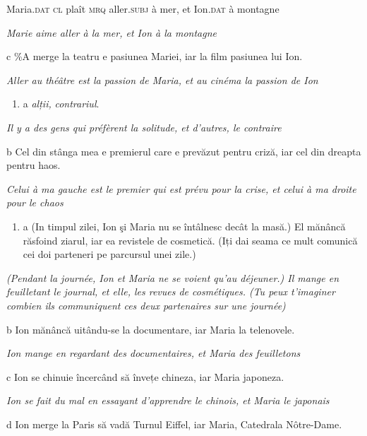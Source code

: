     Maria.\textsc{dat cl} plaît \textsc{mrq} aller.\textsc{subj} à mer, et Ion\textsc{.dat} à montagne

{\itshape
Marie aime aller à la mer, et Ion à la montagne}

  c  \%A merge la teatru e pasiunea Mariei, iar la film pasiunea lui Ion.

{\itshape
Aller au théâtre est la passion de Maria, et au cinéma la passion de Ion}


\begin{enumerate}
\item \label{bkm:Ref289719799}a   \emph{\textup{alții,}}\emph{\textbf{\textup{} }}\emph{\textup{contrariul}}.


\end{enumerate}
{\itshape
Il y a des gens qui préfèrent la solitude, et d'autres, le contraire}

  b  Cel din stânga mea e premierul care e prevăzut pentru criză, iar cel din dreapta pentru haos. 

{\itshape
Celui à ma gauche est le premier qui est prévu pour la crise, et celui à ma droite pour le chaos}


\begin{enumerate}
\item \label{bkm:Ref289719802}a  (In timpul zilei, Ion şi Maria nu se întâlnesc decât la masă.) El mănâncă răsfoind ziarul, iar ea revistele de cosmetică. (Iți dai seama ce mult comunică cei doi parteneri pe parcursul unei zile.)


\end{enumerate}
{\itshape
(Pendant la journée, Ion et Maria ne se voient qu'au déjeuner.) Il mange en feuilletant le journal, et elle, les revues de cosmétiques. (Tu peux t'imaginer combien ils communiquent ces deux partenaires sur une journée) } 

  b  Ion mănâncă uitându-se la documentare, iar Maria la telenovele.

{\itshape
Ion mange en regardant des documentaires, et Maria des feuilletons}

  c  Ion se chinuie încercând să învețe chineza, iar Maria japoneza.

{\itshape
Ion se fait du mal en essayant d'apprendre le chinois, et Maria le japonais}

  d  Ion merge la Paris să vadă Turnul Eiffel, iar Maria, Catedrala Nôtre-Dame.

